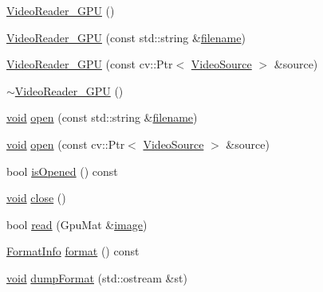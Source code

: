 \begin{DoxyCompactItemize}
\item 
\hyperlink{classcv_1_1gpu_1_1VideoReader__GPU_a1b58dc761b8a0e9c42d7b030823209a4}{Video\-Reader\-\_\-\-G\-P\-U} ()
\item 
\hyperlink{classcv_1_1gpu_1_1VideoReader__GPU_abf6eba3b8f8d21641f2a99855af1269e}{Video\-Reader\-\_\-\-G\-P\-U} (const std\-::string \&\hyperlink{core__c_8h_acc427f35f3bd9f865d39012657cc42f8}{filename})
\item 
\hyperlink{classcv_1_1gpu_1_1VideoReader__GPU_ace53a29b1a19b9897dd53244a5e3071b}{Video\-Reader\-\_\-\-G\-P\-U} (const cv\-::\-Ptr$<$ \hyperlink{classcv_1_1gpu_1_1VideoReader__GPU_1_1VideoSource}{Video\-Source} $>$ \&source)
\item 
\hyperlink{classcv_1_1gpu_1_1VideoReader__GPU_ad8687e17339dcdf99c90722b78370480}{$\sim$\-Video\-Reader\-\_\-\-G\-P\-U} ()
\item 
\hyperlink{legacy_8hpp_a8bb47f092d473522721002c86c13b94e}{void} \hyperlink{classcv_1_1gpu_1_1VideoReader__GPU_ad94a73b88ce7eb96764bb6e544796679}{open} (const std\-::string \&\hyperlink{core__c_8h_acc427f35f3bd9f865d39012657cc42f8}{filename})
\item 
\hyperlink{legacy_8hpp_a8bb47f092d473522721002c86c13b94e}{void} \hyperlink{classcv_1_1gpu_1_1VideoReader__GPU_a54c832d4c1c441f76f620421333285ec}{open} (const cv\-::\-Ptr$<$ \hyperlink{classcv_1_1gpu_1_1VideoReader__GPU_1_1VideoSource}{Video\-Source} $>$ \&source)
\item 
bool \hyperlink{classcv_1_1gpu_1_1VideoReader__GPU_aba2221b61dd830fadefbf9a4139edf74}{is\-Opened} () const 
\item 
\hyperlink{legacy_8hpp_a8bb47f092d473522721002c86c13b94e}{void} \hyperlink{classcv_1_1gpu_1_1VideoReader__GPU_a25b9dc748fda5bba66b8266f62598907}{close} ()
\item 
bool \hyperlink{classcv_1_1gpu_1_1VideoReader__GPU_afddcb4bb69867ea9cec9bef343e2dca2}{read} (Gpu\-Mat \&\hyperlink{legacy_8hpp_ad62b16ab219ae2483e8a3d921c44cc97}{image})
\item 
\hyperlink{structcv_1_1gpu_1_1VideoReader__GPU_1_1FormatInfo}{Format\-Info} \hyperlink{classcv_1_1gpu_1_1VideoReader__GPU_ab38fdab61e5e189727a03933c0d405df}{format} () const 
\item 
\hyperlink{legacy_8hpp_a8bb47f092d473522721002c86c13b94e}{void} \hyperlink{classcv_1_1gpu_1_1VideoReader__GPU_ad5feef8d69b8c09b625fee382fe43004}{dump\-Format} (std\-::ostream \&st)
\end{DoxyCompactItemize}


